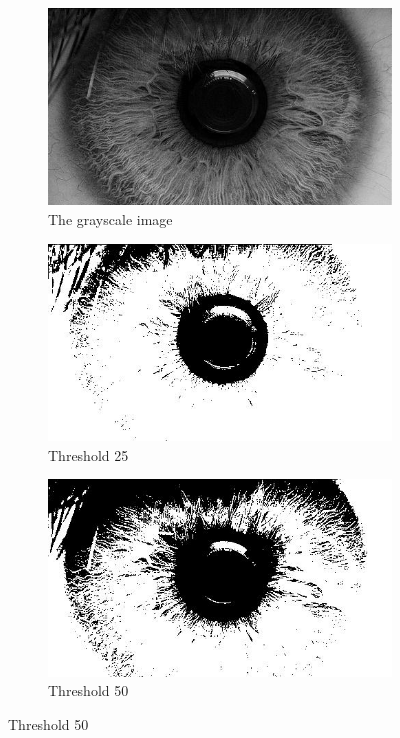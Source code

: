 \documentclass{article}
\begin{document}
\begin{figure}[H]
\centering

\begin{subfigure}[b]{0.5\linewidth}
\centering
  \includegraphics[width=0.9\linewidth]{res/grayscale.jpg}
  \caption{The grayscale image}
   \label{fig:tresh_gray}
\end{subfigure}%

\begin{subfigure}[b]{0.5\linewidth}
\centering
  \includegraphics[width=0.9\linewidth]{res/tresh25.jpg}
  \caption{Threshold 25}
   \label{fig:tresh_25}
\end{subfigure}%
\begin{subfigure}[b]{0.5\linewidth}
\centering
  \includegraphics[width=0.9\linewidth]{res/tresh50.jpg}
  \caption{Threshold 50}
   \label{fig:original}
\end{subfigure}%


\end{figure}
\end{document}
